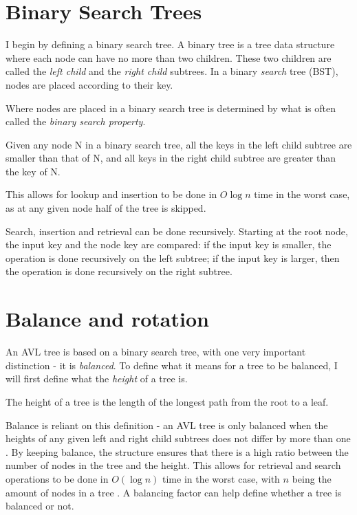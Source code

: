 
\section{Binary Search Trees} 
I begin by defining a binary search tree. A binary tree is a tree data structure where each node can have no more than two children. These two children are 
called the \textit{left child} and the \textit{right child} subtrees. In a binary \textit{search} tree (BST), nodes are placed according to their key. 

Where nodes are placed in a binary search tree is determined by what is often called the \textit{binary search property}.

\begin{definition}
  \label{def:bst_property}
  Given any node N in a binary search tree, all the keys in the left child subtree are smaller than that of N, and all keys in the right child subtree are greater than the 
  key of N.
\end{definition}

This allows for lookup and insertion to be done in $O \log n$ time in the worst case, as at any given node half of the tree is skipped.

Search, insertion and retrieval can be done recursively. Starting at the root node, the input key and the node key are compared: if the input key is smaller,
the operation is done recursively on the left subtree; if the input key is larger, then the operation is done recursively on the right subtree.

\section{Balance and rotation}
An AVL tree is based on a binary search tree, with one very important distinction - it is \textit{balanced}. To define what it means for a tree to be balanced, I will first
define what the \textit{height} of a tree is.

\begin{definition}
  \label{def:height}
  The height of a tree is the length of the longest path from the root to a leaf.
\end{definition} 
 
Balance is reliant on this definition - an AVL tree is only balanced when the 
heights of any given left and right child subtrees does not differ by more than one \cite{avl:original}. By keeping balance, the structure ensures that there is a high ratio between the number of 
nodes in the tree and the height. This allows for retrieval and search operations to be done in $O(\log n)$ time in the worst case, with $n$ being the amount of nodes in a tree \cite{avl:computer}. A
balancing factor can help define whether a tree is balanced or not.


